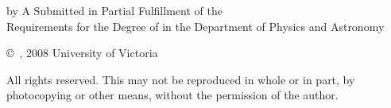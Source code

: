 \pagebreak
{
	\centering
	\thesistitle
	\tpbreak
	by
	\tpbreak
	\nameanddegrees
	\tpbreak
	A \PhDorMas Submitted in Partial Fulfillment of the \\
	Requirements for the Degree of
	\tpbreak
	\PhDorMaster
	\tpbreak
	in the Department of Physics and Astronomy\\
	\vfill
	\begin{center}
		\copyright\ \yourname, 2008 \linebreak
		\phantom{\copyright} University of Victoria
	\end{center}
	\tpbreak
	All rights reserved. This \PhDorMas may not be reproduced in whole or in part, by \\
	\hfill photocopying or other means, without the permission of the author. 
	\hfill
}
\pagebreak
